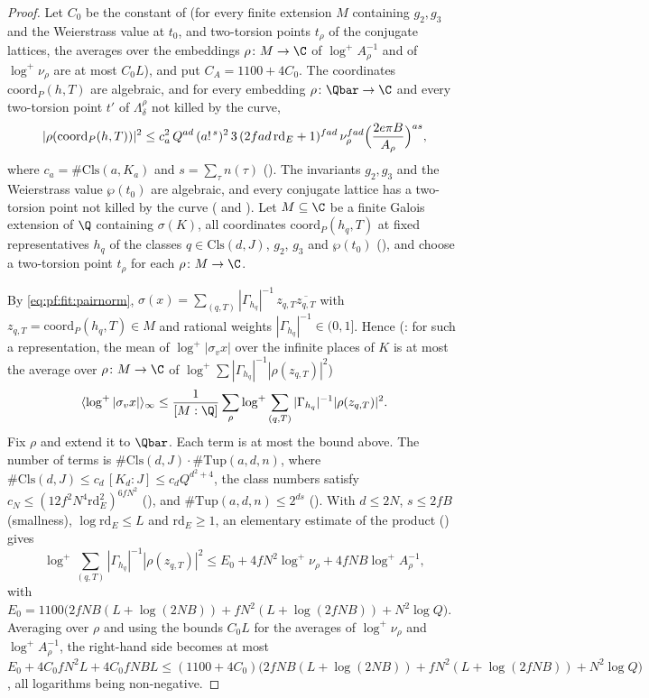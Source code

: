 \begin{proof}
Let $C_0$ be the constant of  (for every finite
extension $M$ containing $g_2,g_3$ and the Weierstrass value at $t_0$, and two-torsion points $t_\rho$ of the conjugate
lattices, the averages over the embeddings $\rho\colon M\to\C$ of $\log^+A_\rho^{-1}$ and of $\log^+\nu_\rho$ are at most
$C_0L$), and put $C_A=1100+4C_0$. The coordinates $\mathrm{coord}_P(h,T)$ are algebraic, and for every embedding
$\rho\colon\Qbar\to\C$ and every two-torsion point $t'$ of $\Lambda_\delta^\rho$ not killed by the curve,
\[
|\rho(\mathrm{coord}_P(h,T))|^2\le c_a^2\,Q^{ad}\,(a!^{\,s})^2\,3\,(2fad\,\mathrm{rd}_E+1)^{fad}\,\nu_\rho^{fad}
\Bigl(\frac{2e\pi B}{A_\rho}\Bigr)^{as},
\]
where $c_a=\#\mathrm{Cls}(a,K_a)$ and $s=\sum_\tau n(\tau)$
(). The invariants $g_2,g_3$ and the Weierstrass value
$\wp(t_0)$ are algebraic, and every conjugate lattice has a two-torsion point not killed by the curve
( and ). Let
$M\subseteq\C$ be a finite Galois extension of $\Q$ containing $\sigma(K)$, all coordinates $\mathrm{coord}_P(h_q,T)$ at fixed
representatives $h_q$ of the classes $q\in\mathrm{Cls}(d,J)$, $g_2$, $g_3$ and $\wp(t_0)$
(), and choose a two-torsion point $t_\rho$ for each $\rho\colon M\to\C$.

By \eqref{eq:pf:fit:pairnorm}, $\sigma(x)=\sum_{(q,T)}|\Gamma_{h_q}|^{-1}\,z_{q,T}\overline{z_{q,T}}$ with $z_{q,T}=
\mathrm{coord}_P(h_q,T)\in M$ and rational weights $|\Gamma_{h_q}|^{-1}\in(0,1]$. Hence
(: for such a representation, the mean of $\log^+|\sigma_vx|$ over the infinite
places of $K$ is at most the average over $\rho\colon M\to\C$ of $\log^+\sum|\Gamma_{h_q}|^{-1}|\rho(z_{q,T})|^2$)
\[
\fitmi{\log^+|\sigma_vx|}\le\frac1{[M:\Q]}\sum_{\rho}\log^+\sum_{(q,T)}|\Gamma_{h_q}|^{-1}|\rho(z_{q,T})|^2 .
\]
Fix $\rho$ and extend it to $\Qbar$. Each term is at most the bound above. The number of terms is
$\#\mathrm{Cls}(d,J)\cdot\#\mathrm{Tup}(a,d,n)$, where $\#\mathrm{Cls}(d,J)\le c_d\,[K_d:J]\le c_dQ^{d^2+4}$, the class numbers
satisfy $c_N\le(12f^2N^4\mathrm{rd}_E^2)^{6fN^2}$ (), and
$\#\mathrm{Tup}(a,d,n)\le2^{ds}$ (). With $d\le2N$, $s\le2fB$ (smallness),
$\log\mathrm{rd}_E\le L$ and $\mathrm{rd}_E\ge1$, an elementary estimate of the product
() gives
\[
\log^+\sum_{(q,T)}|\Gamma_{h_q}|^{-1}|\rho(z_{q,T})|^2\le E_0+4fN^2\log^+\nu_\rho+4fNB\log^+A_\rho^{-1},
\]
with $E_0=1100\bigl(2fNB(L+\log(2NB))+fN^2(L+\log(2fNB))+N^2\log Q\bigr)$. Averaging over $\rho$ and using the bounds $C_0L$ for
the averages of $\log^+\nu_\rho$ and $\log^+A_\rho^{-1}$, the right-hand side becomes at most
$E_0+4C_0fN^2L+4C_0fNBL\le(1100+4C_0)\bigl(2fNB(L+\log(2NB))+fN^2(L+\log(2fNB))+N^2\log Q\bigr)$, all logarithms being
non-negative.
\end{proof}

